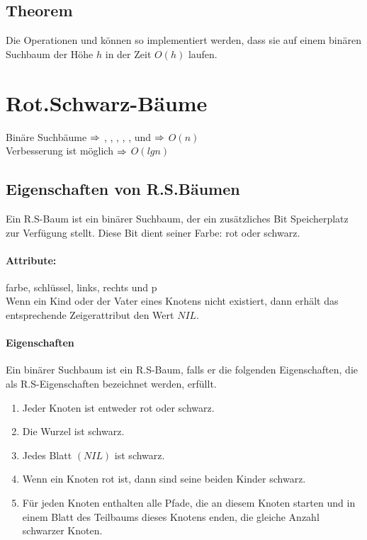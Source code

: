 \documentclass[a4paper]{scrartcl}
\begin{document}
\subsection{Theorem}

Die Operationen  und  können so implementiert werden, dass sie auf einem binären Suchbaum der Höhe $h$
in der Zeit $O(h)$ laufen.

\section{Rot.Schwarz-Bäume}

Binäre Suchbäume $\Rightarrow$ , , , , ,  und 
 $\Rightarrow$ $O(n)$ \\
Verbesserung ist möglich $\Rightarrow$ $O(lgn)$

\subsection{Eigenschaften von R.S.Bäumen}

Ein R.S-Baum ist ein binärer Suchbaum, der ein zusätzliches Bit Speicherplatz zur Verfügung stellt. Diese Bit dient seiner
Farbe: rot oder schwarz.


\paragraph{Attribute:}

farbe, schlüssel, links, rechts und p \\
Wenn ein Kind oder der Vater eines Knotens nicht existiert, dann erhält das entsprechende Zeigerattribut den Wert $NIL$.

\paragraph{Eigenschaften}

Ein binärer Suchbaum ist ein R.S-Baum, falls er die folgenden Eigenschaften, die als R.S-Eigenschaften bezeichnet werden,
erfüllt.
\begin{enumerate}
\item Jeder Knoten ist entweder rot oder schwarz.
\item Die Wurzel ist schwarz.
\item Jedes Blatt $(NIL)$ ist schwarz.
\item Wenn ein Knoten rot ist, dann sind seine beiden Kinder schwarz.
\item Für jeden Knoten enthalten alle Pfade, die an diesem Knoten starten und in einem Blatt des Teilbaums dieses Knotens enden,
die gleiche Anzahl schwarzer Knoten.
\end{enumerate}
\end{document}

